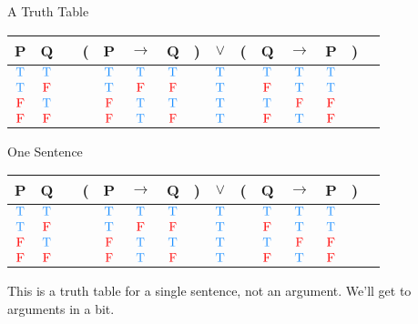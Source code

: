 \documentclass[
  ignorenonframetext,
]{beamer}
\renewcommand{\,}{\text{, }}
\def\True{\textcolor{dodgerblue}{\text{T}}}
\def\False{\textcolor{red}{\text{F}}}
\begin{document}
\begin{frame}{A Truth Table}
\protect\hypertarget{a-truth-table}{}

\begin{center}
\begin{tabular}{@{ }c@{ }@{ }c | c@{ }@{}c@{}@{ }c@{ }@{ }c@{ }@{ }c@{ }@{}c@{}@{ }c@{ }@{}c@{}@{ }c@{ }@{ }c@{ }@{ }c@{ }@{}c@{}@{ }c}
P & Q &  & ( & P & $\rightarrow$ & Q & ) & $\lor$ & ( & Q & $\rightarrow$ & P & ) & \\
\hline 
$\True$ & $\True$ &  &  & $\True$ & $\True$ & $\True$ &  & \textcolor{red}{$\True$} &  & $\True$ & $\True$ & $\True$ &  & \\
$\True$ & $\False$ &  &  & $\True$ & $\False$ & $\False$ &  & \textcolor{red}{$\True$} &  & $\False$ & $\True$ & $\True$ &  & \\
$\False$ & $\True$ &  &  & $\False$ & $\True$ & $\True$ &  & \textcolor{red}{$\True$} &  & $\True$ & $\False$ & $\False$ &  & \\
$\False$ & $\False$ &  &  & $\False$ & $\True$ & $\False$ &  & \textcolor{red}{$\True$} &  & $\False$ & $\True$ & $\False$ &  & \\
\end{tabular}
\bigskip
\end{center}

\end{frame}

\begin{frame}{One Sentence}
\protect\hypertarget{one-sentence}{}

\begin{center}
\begin{tabular}{@{ }c@{ }@{ }c | c@{ }@{}c@{}@{ }c@{ }@{ }c@{ }@{ }c@{ }@{}c@{}@{ }c@{ }@{}c@{}@{ }c@{ }@{ }c@{ }@{ }c@{ }@{}c@{}@{ }c}
P & Q &  & ( & P & $\rightarrow$ & Q & ) & $\lor$ & ( & Q & $\rightarrow$ & P & ) & \\
\hline 
$\True$ & $\True$ &  &  & $\True$ & $\True$ & $\True$ &  & \textcolor{red}{$\True$} &  & $\True$ & $\True$ & $\True$ &  & \\
$\True$ & $\False$ &  &  & $\True$ & $\False$ & $\False$ &  & \textcolor{red}{$\True$} &  & $\False$ & $\True$ & $\True$ &  & \\
$\False$ & $\True$ &  &  & $\False$ & $\True$ & $\True$ &  & \textcolor{red}{$\True$} &  & $\True$ & $\False$ & $\False$ &  & \\
$\False$ & $\False$ &  &  & $\False$ & $\True$ & $\False$ &  & \textcolor{red}{$\True$} &  & $\False$ & $\True$ & $\False$ &  & \\
\end{tabular}
\bigskip
\end{center}

This is a truth table for a single sentence, not an argument. We'll get
to arguments in a bit.

\end{frame}
\end{document}
